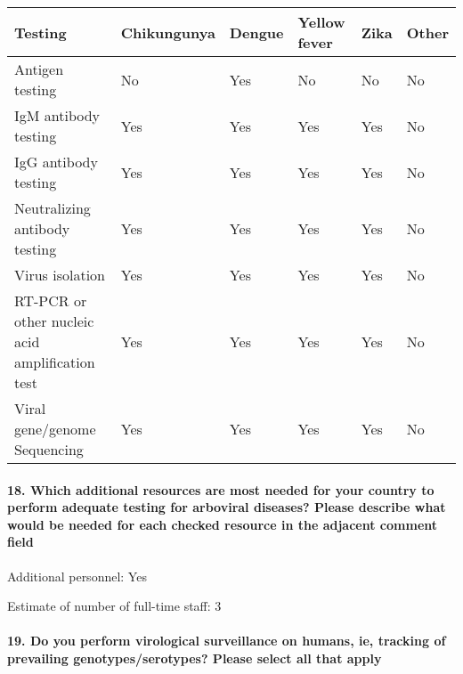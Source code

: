 \documentclass[
]{article}
\begin{document}
\begin{longtable}[]{@{}llllll@{}}
\toprule
Testing & Chikungunya & Dengue & Yellow fever & Zika & Other \\
\midrule
\endhead
Antigen testing & No & Yes & No & No & No \\
IgM antibody testing & Yes & Yes & Yes & Yes & No \\
IgG antibody testing & Yes & Yes & Yes & Yes & No \\
Neutralizing antibody testing & Yes & Yes & Yes & Yes & No \\
Virus isolation & Yes & Yes & Yes & Yes & No \\
RT-PCR or other nucleic acid amplification test & Yes & Yes & Yes & Yes
& No \\
Viral gene/genome Sequencing & Yes & Yes & Yes & Yes & No \\
\bottomrule
\end{longtable}

\hypertarget{which-additional-resources-are-most-needed-for-your-country-to-perform-adequate-testing-for-arboviral-diseases-please-describe-what-would-be-needed-for-each-checked-resource-in-the-adjacent-comment-field}{%
\paragraph{18. Which additional resources are most needed for your
country to perform adequate testing for arboviral diseases? Please
describe what would be needed for each checked resource in the adjacent
comment
field}\label{which-additional-resources-are-most-needed-for-your-country-to-perform-adequate-testing-for-arboviral-diseases-please-describe-what-would-be-needed-for-each-checked-resource-in-the-adjacent-comment-field}}

Additional personnel: Yes

Estimate of number of full-time staff: 3

\hypertarget{do-you-perform-virological-surveillance-on-humans-ie-tracking-of-prevailing-genotypesserotypes-please-select-all-that-apply}{%
\paragraph{19. Do you perform virological surveillance on humans, ie,
tracking of prevailing genotypes/serotypes? Please select all that
apply}\label{do-you-perform-virological-surveillance-on-humans-ie-tracking-of-prevailing-genotypesserotypes-please-select-all-that-apply}}
\end{document}
